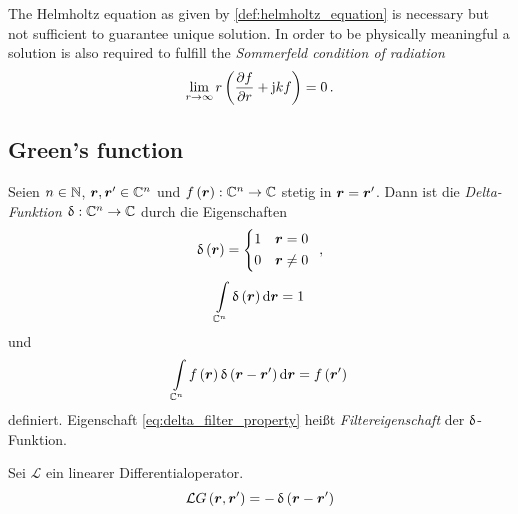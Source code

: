 \begin{remark}\label{sommerfeld_radiation_condition}
	The Helmholtz equation as given by \cref{def:helmholtz_equation} is necessary but not sufficient to guarantee unique solution. In order to be physically meaningful a solution is also required to fulfill the \emph{Sommerfeld condition of radiation} \cite[S.~189]{Sommerfeld1964}
	\begin{equation}
		\lim\limits_{r\rightarrow\infty} r \left(\pd[f]{r} + \im k f \right) = 0 \, .
	\end{equation}
\end{remark}

\subsection{Green's function}

\begin{definition}
	Seien $n\in\N$, $\robs,\rsrc\in\C^n$ und $f\left(\robs\right):\C^n\rightarrow\C$ stetig in $\robs = \rsrc$. Dann ist die \emph{Delta-Funktion} $\diracDelta:\C^n \rightarrow \C$ durch die Eigenschaften
	\begin{equation}
		\diracDelta\left(\robs\right) = \begin{cases*}
			1 & $\robs = 0$ \\
			0 & $\robs \neq 0$
		\end{cases*} \, ,
	\end{equation}
	\begin{equation}
		\int\limits_{\C^n} \diracDelta\left(\robs\right) \dd \robs = 1
	\end{equation}
	und
	\begin{equation}\label{eq:delta_filter_property}
		\int\limits_{\C^n} f\left(\robs\right) \diracDelta\left(\robs-\rsrc\right) \dd \robs = f\left(\rsrc\right)
	\end{equation}
	definiert. Eigenschaft \eqref{eq:delta_filter_property} heißt \emph{Filtereigenschaft} der $\diracDelta$-Funktion.
\end{definition}

\begin{definition}
	Sei $\mathcal{L}$ ein linearer Differentialoperator.
	\begin{equation}
		\mathcal{L} G\left(\robs, \rsrc \right) = -\diracDelta\left(\robs - \rsrc\right)
	\end{equation}
\end{definition}



